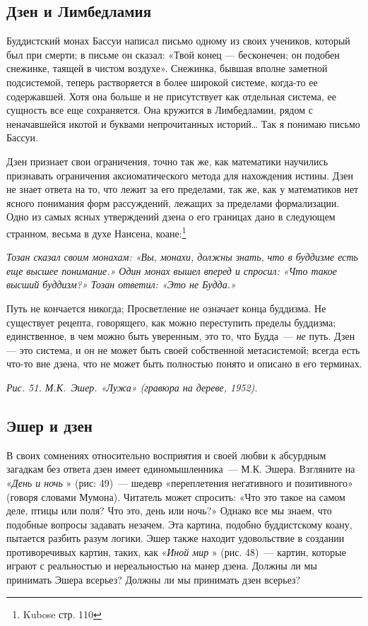 \documentclass[../main.tex]{subfiles}
\begin{document}
\subsection{Дзен и Лимбедламия}

Буддистский монах Бассуи написал письмо одному из своих учеников, который был при смерти; в письме он сказал: «Твой конец --- бесконечен; он подобен снежинке, таящей в чистом воздухе». Снежинка, бывшая вполне заметной подсистемой, теперь растворяется в более широкой системе, когда-то ее содержавшей. Хотя она больше и не присутствует как отдельная система, ее сущность все еще сохраняется. Она кружится в Лимбедламии, рядом с неначавшейся икотой и буквами непрочитанных историй\ldots{} Так я понимаю письмо Бассуи.

Дзен признает свои ограничения, точно так же, как математики научились признавать ограничения аксиоматического метода для нахождения истины. Дзен не знает ответа на то, что лежит за его пределами, так же, как у математиков нет ясного понимания форм рассуждений, лежащих за пределами формализации. Одно из самых ясных утверждений дзена о его границах дано в следующем странном, весьма в духе Нансена, коане:\footnote{Kubose стр. 110}

\emph{Тозан сказал своим монахам: «Вы, монахи, должны знать, что в буддизме есть еще высшее понимание.» Один монах вышел вперед и спросил: «Что такое высший буддизм?» Тозан ответил: «Это не Будда.»}

Путь не кончается никогда; Просветление не означает конца буддизма. Не существует рецепта, говорящего, как можно переступить пределы буддизма; единственное, в чем можно быть уверенным, это то, что Будда~--- \emph{не} путь. Дзен --- это система, и он не может быть своей собственной метасистемой; всегда есть что-то вне дзена, что не может быть полностью понято и описано в его терминах.

\emph{Рис. 51. М.К.~Эшер. «Лужа» (гравюра на дереве, 1952).}


\subsection{Эшер и дзен}

В своих сомнениях относительно восприятия и своей любви к абсурдным загадкам без ответа дзен имеет единомышленника~--- М.К. Эшера. Взгляните на «\emph{День и ночь} » (рис: 49)~--- шедевр «переплетения негативного и позитивного» (говоря словами Мумона). Читатель может спросить: «Что это такое на самом деле, птицы или поля? Что это, день или ночь?» Однако все мы знаем, что подобные вопросы задавать незачем. Эта картина, подобно буддистскому коану, пытается разбить разум логики. Эшер также находит удовольствие в создании противоречивых картин, таких, как «\emph{Иной мир} » (рис. 48)~--- картин, которые играют с реальностью и нереальностью на манер дзена. Должны ли мы принимать Эшера всерьез? Должны ли мы принимать дзен всерьез?
\end{document}

